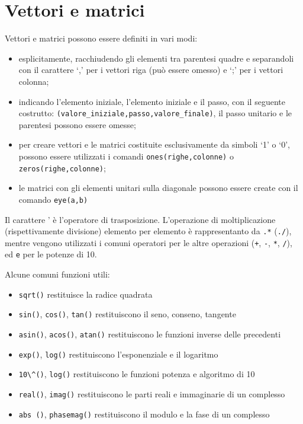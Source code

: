 \section{Vettori e matrici}
Vettori e matrici possono essere definiti in vari modi: 
\begin{itemize}
\item esplicitamente, racchiudendo gli elementi tra parentesi quadre e separandoli con il carattere `,' per i vettori riga (pu\`o essere omesso) e `;' per i vettori colonna;
\item indicando l'elemento iniziale, l'elemento iniziale e il passo, con il seguente costrutto: \verb+(valore_iniziale,passo,valore_finale)+, il passo unitario e le parentesi possono essere omesse;
\item per creare vettori e le matrici costituite esclusivamente da simboli `1' o `0', possono essere utilizzati i comandi \verb+ones(righe,colonne)+ o \verb+zeros(righe,colonne)+;
\item le matrici con gli elementi unitari sulla diagonale possono essere create con il comando \verb+eye(a,b)+
\end{itemize}

Il carattere ' \`e l'operatore di trasposizione.
L'operazione di moltiplicazione (rispettivamente divisione) elemento per elemento \`e rappresentanto da \verb+.*+ (\verb+./+), mentre vengono utilizzati i comuni operatori per le altre operazioni (\verb-+-, \verb+-+, \verb+*+, \verb+/+), ed \verb+e+ per le potenze di 10.

Alcune comuni funzioni utili:
\begin{itemize}
\item \verb+sqrt()+ restituisce la radice quadrata
\item \verb+sin()+, \verb+cos()+, \verb+tan()+ restituiscono il seno, conseno, tangente
\item \verb+asin()+, \verb+acos()+, \verb+atan()+ restituiscono le funzioni inverse delle precedenti
\item \verb+exp()+, \verb+log()+ restituiscono l'esponenziale e il logaritmo
\item \verb+10\^()+, \verb+log()+ restituiscono le funzioni potenza e algoritmo di 10 
\item \verb+real()+, \verb+imag()+ restituiscono le parti reali e immaginarie di un complesso
\item \verb+abs ()+, \verb+phasemag()+ restituiscono il modulo e la fase di un complesso
\end{itemize}


